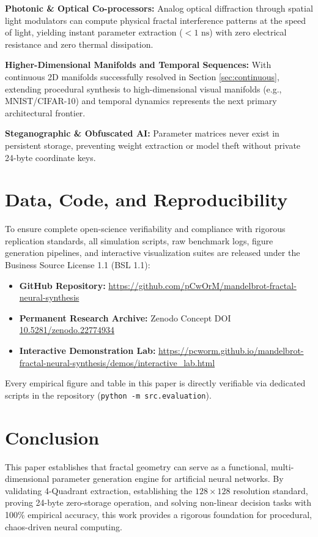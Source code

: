 \documentclass[10pt,journal,compsoc,twocolumn]{article}
\begin{document}
\textbf{Photonic \& Optical Co-processors:} Analog optical diffraction through spatial light modulators can compute physical fractal interference patterns at the speed of light, yielding instant parameter extraction ($< 1\text{ ns}$) with zero electrical resistance and zero thermal dissipation.

\textbf{Higher-Dimensional Manifolds and Temporal Sequences:} With continuous 2D manifolds successfully resolved in Section \ref{sec:continuous}, extending procedural synthesis to high-dimensional visual manifolds (e.g., MNIST/CIFAR-10) and temporal dynamics represents the next primary architectural frontier.

\textbf{Steganographic \& Obfuscated AI:} Parameter matrices never exist in persistent storage, preventing weight extraction or model theft without private 24-byte coordinate keys.

\section{Data, Code, and Reproducibility}
To ensure complete open-science verifiability and compliance with rigorous replication standards, all simulation scripts, raw benchmark logs, figure generation pipelines, and interactive visualization suites are released under the Business Source License 1.1 (BSL 1.1):
\begin{itemize}
    \item \textbf{GitHub Repository:} \url{https://github.com/pCwOrM/mandelbrot-fractal-neural-synthesis}
    \item \textbf{Permanent Research Archive:} Zenodo Concept DOI \href{https://doi.org/10.5281/zenodo.22774934}{10.5281/zenodo.22774934}~\cite{dagli2026mandelbrot}
    \item \textbf{Interactive Demonstration Lab:} \url{https://pcworm.github.io/mandelbrot-fractal-neural-synthesis/demos/interactive_lab.html}
\end{itemize}
Every empirical figure and table in this paper is directly verifiable via dedicated scripts in the repository (\texttt{python -m src.evaluation}).

\section{Conclusion}
This paper establishes that fractal geometry can serve as a functional, multi-dimensional parameter generation engine for artificial neural networks. By validating 4-Quadrant extraction, establishing the $128 \times 128$ resolution standard, proving 24-byte zero-storage operation, and solving non-linear decision tasks with 100\% empirical accuracy, this work provides a rigorous foundation for procedural, chaos-driven neural computing.
\end{document}

